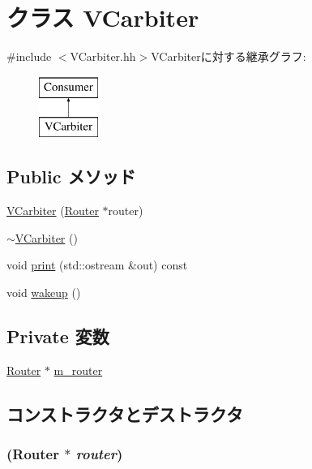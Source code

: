 \hypertarget{classVCarbiter}{
\section{クラス VCarbiter}
\label{classVCarbiter}
}


{\ttfamily \#include $<$VCarbiter.hh$>$}VCarbiterに対する継承グラフ:\begin{figure}[H]
\begin{center}
\leavevmode
\includegraphics[height=2cm]{classVCarbiter}
\end{center}
\end{figure}
\subsection*{Public メソッド}
\begin{DoxyCompactItemize}
\item 
\hyperlink{classVCarbiter_a897ae5f7b2683eb7fd4f15e4cf23e6de}{VCarbiter} (\hyperlink{classRouter}{Router} $\ast$router)
\item 
\hyperlink{classVCarbiter_afafb5cfdbc21827fa86927218f39b6c0}{$\sim$VCarbiter} ()
\item 
void \hyperlink{classVCarbiter_ac55fe386a101fbae38c716067c9966a0}{print} (std::ostream \&out) const 
\item 
void \hyperlink{classVCarbiter_ae674290a26ecbd622c5160e38e8a4fe9}{wakeup} ()
\end{DoxyCompactItemize}
\subsection*{Private 変数}
\begin{DoxyCompactItemize}
\item 
\hyperlink{classRouter}{Router} $\ast$ \hyperlink{classVCarbiter_a6886b69e234a3d5fbea014763cd377f2}{m\_\-router}
\end{DoxyCompactItemize}


\subsection{コンストラクタとデストラクタ}
\hypertarget{classVCarbiter_a897ae5f7b2683eb7fd4f15e4cf23e6de}{
\subsubsection[{VCarbiter}]{ ({\bf Router} $\ast$ {\em router})}}
\label{classVCarbiter_a897ae5f7b2683eb7fd4f15e4cf23e6de}



